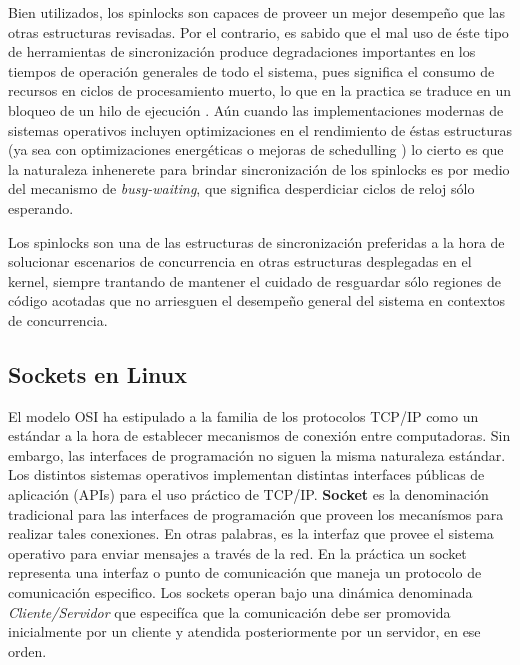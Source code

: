 Bien utilizados, los spinlocks son capaces de proveer un mejor desempeño que las otras estructuras revisadas. Por el contrario, es sabido que el mal uso de éste tipo de herramientas de sincronización produce degradaciones importantes en los tiempos de operación generales de todo el sistema, pues significa el consumo de recursos en ciclos de procesamiento muerto, lo que en la practica se traduce en un bloqueo de un hilo de ejecución \cite{paper:nonscalablelocks, paper:cachebouncing}. Aún cuando las implementaciones modernas de sistemas operativos incluyen optimizaciones en el rendimiento de éstas estructuras (ya sea con optimizaciones energéticas o mejoras de schedulling \cite{paper:cacheaffinity}) lo cierto es que la naturaleza inhenerete para brindar sincronización de los spinlocks es por medio del mecanismo de \emph{busy-waiting}, que significa desperdiciar ciclos de reloj sólo esperando.

Los spinlocks son una de las estructuras de sincronización preferidas a la hora de solucionar escenarios de concurrencia en otras estructuras desplegadas en el kernel, siempre trantando de mantener el cuidado de resguardar sólo regiones de código acotadas que no arriesguen el desempeño general del sistema en contextos de concurrencia.

\subsection{Sockets en Linux}
El modelo OSI ha estipulado a la familia de los protocolos TCP/IP como un estándar a la hora de establecer mecanismos de conexión entre computadoras. Sin embargo, las interfaces de programación no siguen la misma naturaleza estándar. Los distintos sistemas operativos implementan distintas interfaces públicas de aplicación (APIs) para el uso práctico de TCP/IP. \textbf{Socket} es la denominación tradicional para las interfaces de programación que proveen los mecanísmos para realizar tales conexiones. En otras palabras, es la interfaz que provee el sistema operativo para enviar mensajes a través de la red. En la práctica un socket representa una interfaz o punto de comunicación que maneja un protocolo de comunicación especifico. Los sockets operan bajo una dinámica denominada \emph{Cliente/Servidor} que especifíca que la comunicación debe ser promovida inicialmente por un cliente y atendida posteriormente por un servidor, en ese orden.

